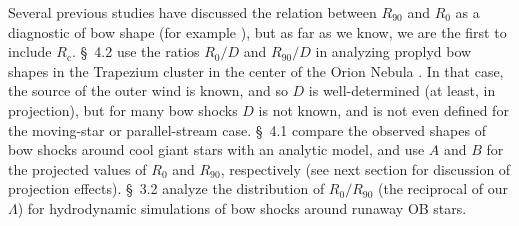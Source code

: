 \documentclass[useAMS, usenatbib, a4paper]{mnras}
\newcommand\C{\ensuremath{\mathrm{c}}}
\newcommand\uvec[1]{\bm{\hat{#1}}} %
\newcommand\T{_{\mathrm{\scriptscriptstyle T}}} %
\providecommand{\DIFdelbegin}{} %
\providecommand{\DIFdelend}{} %
\begin{document}
Several previous studies have discussed the relation between
\(R_{90}\) and \(R_0\) as a diagnostic of bow shape (for example
\citealp{Robberto:2005, Cox:2012a, Meyer:2016a}), but as far as we
know, we are the first to include \(R_{\C}\).  \citet{Robberto:2005}
\S~4.2 use the ratios \(R_0/D\) and \(R_{90}/D\) in analyzing proplyd
bow shapes in the Trapezium cluster in the center of the Orion Nebula
\citep{Hayward:1994a, Garcia-Arredondo:2001a, Smith:2005a}.  In that
case, the source of the outer wind is known, and so \(D\) is
well-determined (at least, in projection), but for many bow shocks
\(D\) is not known, and is not even defined for the moving-star or
parallel-stream case. \citet{Cox:2012a} \S~4.1 compare the observed
shapes of bow shocks around cool giant stars with an analytic model,
and use \(A\) and \(B\) for the projected values of \(R_0\) and
\(R_{90}\), respectively (see next section for discussion of
projection effects).  \citet{Meyer:2016a} \S~3.2 analyze the
distribution of \(R_0 / R_{90}\) (the reciprocal of our \(\Lambda\)) for
hydrodynamic simulations of bow shocks around runaway OB stars.








\DIFdelbegin %
\DIFdelend 
\end{document}
